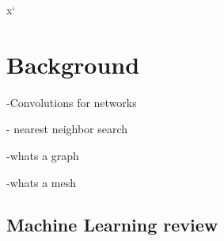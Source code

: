 x`\chapter{Background}
\label{sec:background}

-Convolutions for networks

- nearest neighbor search

-whats a graph

-whats a mesh
\section{Machine Learning review}
\label{ml_review}

